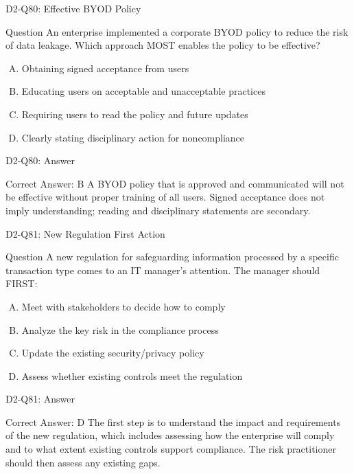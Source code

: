 \documentclass{beamer}
\begin{document}
	\begin{frame}{D2-Q80: Effective BYOD Policy}
		\begin{block}{Question}
			An enterprise implemented a corporate BYOD policy to reduce the risk of data leakage. Which approach MOST enables the policy to be effective?
		\end{block}
		\begin{enumerate}[(A)]
			\item Obtaining signed acceptance from users
			\item Educating users on acceptable and unacceptable practices
			\item Requiring users to read the policy and future updates
			\item Clearly stating disciplinary action for noncompliance
		\end{enumerate}
	\end{frame}
	\begin{frame}{D2-Q80: Answer}
		\begin{block}{Correct Answer: B}
			A BYOD policy that is approved and communicated will not be effective without proper training of all users. Signed acceptance does not imply understanding; reading and disciplinary statements are secondary.
		\end{block}
	\end{frame}
	
	\begin{frame}{D2-Q81: New Regulation First Action}
		\begin{block}{Question}
			A new regulation for safeguarding information processed by a specific transaction type comes to an IT manager's attention. The manager should FIRST:
		\end{block}
		\begin{enumerate}[(A)]
			\item Meet with stakeholders to decide how to comply
			\item Analyze the key risk in the compliance process
			\item Update the existing security/privacy policy
			\item Assess whether existing controls meet the regulation
		\end{enumerate}
	\end{frame}
	\begin{frame}{D2-Q81: Answer}
		\begin{block}{Correct Answer: D}
			The first step is to understand the impact and requirements of the new regulation, which includes assessing how the enterprise will comply and to what extent existing controls support compliance. The risk practitioner should then assess any existing gaps.
		\end{block}
	\end{frame}
	
\end{document}
